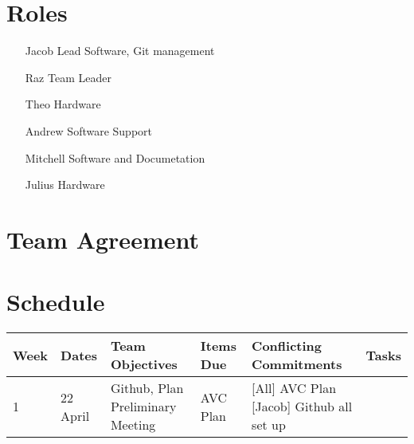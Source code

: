 
\section*{Roles}
\begin{itemize}
    \item[Jacob] Lead Software, Git management
    \item[Raz] Team Leader
    \item[Theo] Hardware
    \item[Andrew] Software Support
    \item[Mitchell] Software and Documetation
    \item[Julius] Hardware
\end{itemize}
\section*{Team Agreement}
\section*{Schedule}
\begin{tabular}{|l|l|l|l|l|l|}
\hline
\textbf{Week} & \textbf{Dates} & \textbf{Team Objectives} & \textbf{Items Due} &
\textbf{Conflicting Commitments} & \textbf{Tasks} \\ \hline \hline
1 & 22 April & Github, Plan Preliminary Meeting & AVC Plan & [All] AVC Plan
[Jacob] Github all set up\\ \hline
\end{tabular}
